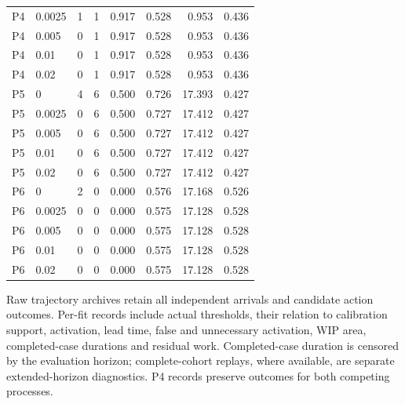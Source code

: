 \begin{longtable}{llrrrrrr}
P4 & 0.0025 & 1 & 1 & 0.917 & 0.528 & 0.953 & 0.436\\

P4 & 0.005 & 0 & 1 & 0.917 & 0.528 & 0.953 & 0.436\\

P4 & 0.01 & 0 & 1 & 0.917 & 0.528 & 0.953 & 0.436\\

P4 & 0.02 & 0 & 1 & 0.917 & 0.528 & 0.953 & 0.436\\

P5 & 0 & 4 & 6 & 0.500 & 0.726 & 17.393 & 0.427\\

P5 & 0.0025 & 0 & 6 & 0.500 & 0.727 & 17.412 & 0.427\\

P5 & 0.005 & 0 & 6 & 0.500 & 0.727 & 17.412 & 0.427\\

P5 & 0.01 & 0 & 6 & 0.500 & 0.727 & 17.412 & 0.427\\

P5 & 0.02 & 0 & 6 & 0.500 & 0.727 & 17.412 & 0.427\\

P6 & 0 & 2 & 0 & 0.000 & 0.576 & 17.168 & 0.526\\

P6 & 0.0025 & 0 & 0 & 0.000 & 0.575 & 17.128 & 0.528\\

P6 & 0.005 & 0 & 0 & 0.000 & 0.575 & 17.128 & 0.528\\

P6 & 0.01 & 0 & 0 & 0.000 & 0.575 & 17.128 & 0.528\\

P6 & 0.02 & 0 & 0 & 0.000 & 0.575 & 17.128 & 0.528\\

\bottomrule\end{longtable}\endgroup

Raw trajectory archives retain all independent arrivals and candidate action outcomes. Per-fit records include actual thresholds, their relation to calibration support, activation, lead time, false and unnecessary activation, WIP area, completed-case durations and residual work. Completed-case duration is censored by the evaluation horizon; complete-cohort replays, where available, are separate extended-horizon diagnostics. P4 records preserve outcomes for both competing processes.


